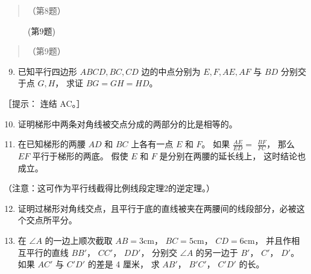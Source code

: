 \begin{quote}
（第8题）
\end{quote}

\begin{figure}
\centering
{}
\caption{(第9题)}
\end{figure}

\begin{quote}
（第9题）
\end{quote}

\begin{enumerate}
\setcounter{enumi}{8}
\item
  已知平行四边形 \(ABCD, BC, CD\) 边的中点分别为 \(E, F, AE, AF\) 与
  \(BD\) 分别交于点 \(G, H\)， 求证 \(BG = GH = HD\)。
\end{enumerate}

［提示： 连结 AC。］

\begin{enumerate}
\setcounter{enumi}{9}
\item
  证明梯形中两条对角线被交点分成的两部分的比是相等的。
\item
  在已知梯形的两腰 \(AD\) 和 \(BC\) 上各有一点 \(E\) 和 \(F\)。 如果
  \(\frac{AE}{ED} =\) \(\frac{BF}{FC}\)， 那么 \(EF\) 平行于梯形的两底。
  假使 \(E\) 和 \(F\) 是分别在两腰的延长线上， 这时结论也成立。
\end{enumerate}

（注意：这可作为平行线截得比例线段定理2的逆定理。）

\begin{enumerate}
\setcounter{enumi}{11}
\item
  证明过梯形对角线交点，且平行于底的直线被夹在两腰间的线段部分，必被这个交点所平分。
\item
  在 \(\angle A\) 的一边上顺次截取 \(AB = 3\mathrm{cm}\)，
  \(BC = 5\mathrm{cm}\)， \(CD = 6\mathrm{cm}\)， 并且作相互平行的直线
  \(BB'\)， \(CC'\)， \(DD'\)， 分别交 \(\angle A\) 的另一边于 \(B'\)，
  \(C'\)， \(D'\)。 如果 \(AC'\) 与 \(C'D'\) 的差是 4 厘米， 求
  \(AB'\)， \(B'C'\)， \(C'D'\) 的长。
\end{enumerate}

